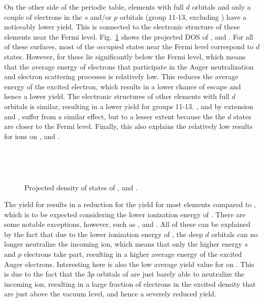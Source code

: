 \begin{refsection}
On the other side of the periodic table, elements with full $d$ orbitals and 
only a couple of electrons in the $s$ and/or $p$ orbitals (group 11-13, 
excluding ) have a noticeably lower yield. This is connected to the 
electronic structure of these elements near the Fermi level. Fig.~\ref{quotas:fig-pdos} 
shows the projected DOS of ,  and . 
For all of these surfaces, most of the occupied states near the Fermi level 
correspond to $d$ states. However, for  these 
lie significantly below the Fermi level, which means that the average energy of electrons that 
participate in the Auger neutralization and electron scattering processes is 
relatively low. This reduces the average energy of the excited electron, 
which results in a lower chance of escape and hence a lower yield. The electronic  structures of 
other elements with full $d$ orbitals is similar, resulting in a lower yield 
for groups 11-13. , and by extension  and , suffer from a
similar effect, but to a lesser extent because the 
the $d$ states are closer to the Fermi level. Finally, this also explains the relatively low results for  ions on ,  and . 

{
\begin{figure}[ht] 
    \begin{subfigure}[t]{0.33\textwidth} 
        \centering 
        
    \end{subfigure}%
    ~  
    \begin{subfigure}[t]{0.29\textwidth} 
        \centering 
        
    \end{subfigure} 
    ~
    \begin{subfigure}[t]{0.29\textwidth}
        \centering 
          
    \end{subfigure}
    \caption{\label{quotas:fig-pdos}Projected density of states of ,  and .} 
\end{figure}
}
 
The yield for  results in a reduction for the yield for most elements 
compared to , which is to be expected considering the lower ionization 
energy of . There are some notable exceptions, however, such as ,  
and . All of these can be explained by the fact that due to the lower 
ionization energy of , the deep $d$ orbitals can no longer neutralize 
the incoming ion, which means that only the higher energy $s$ and $p$ electrons take 
part, resulting in a higher average energy of the excited Auger electrons. 
Interesting here is also the low average yield value for  on . 
This is due to the fact that the $3p$ orbitals of  are just barely able 
to neutralize the incoming ion, resulting in a large fraction of electrons in 
the excited density that are just above the vacuum level, and hence a severely 
reduced yield. 


\end{refsection}
